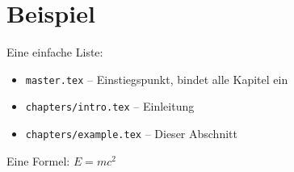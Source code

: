\section{Beispiel}
Eine einfache Liste:
\begin{itemize}
  \item \texttt{master.tex} -- Einstiegspunkt, bindet alle Kapitel ein
  \item \texttt{chapters/intro.tex} -- Einleitung
  \item \texttt{chapters/example.tex} -- Dieser Abschnitt
\end{itemize}

Eine Formel: $E = mc^2$
